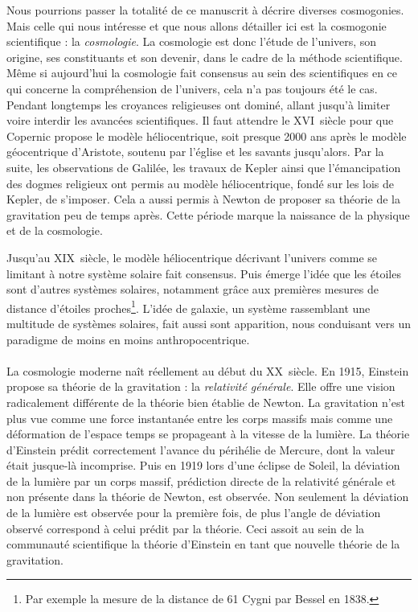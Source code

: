 Nous pourrions passer la totalité de ce manuscrit à décrire diverses cosmogonies. Mais celle qui nous intéresse et que nous allons détailler ici est la cosmogonie scientifique : la \emph{cosmologie}. La cosmologie est donc l'étude de l'univers, son origine, ses constituants et son devenir, dans le cadre de la méthode scientifique. Même si aujourd'hui la cosmologie fait consensus au sein des scientifiques en ce qui concerne la compréhension de l'univers, cela n'a pas toujours été le cas. Pendant longtemps les croyances religieuses ont dominé, allant jusqu'à limiter voire interdir les avancées scientifiques.
Il faut attendre le \textsc{XVI}\ieme~siècle pour que Copernic propose le modèle héliocentrique, soit presque \num{2000} ans après le modèle géocentrique d'Aristote, soutenu par l'église et les savants jusqu'alors.
Par la suite, les observations de Galilée, les travaux de Kepler ainsi que l'émancipation des dogmes religieux ont permis au modèle héliocentrique, fondé sur les lois de Kepler, de s'imposer. Cela a aussi permis à Newton de proposer sa théorie de la gravitation peu de temps après. Cette période marque la naissance de la physique et de la cosmologie.

Jusqu'au \textsc{XIX}\ieme~siècle, le modèle héliocentrique décrivant l'univers comme se limitant à notre système solaire fait consensus. Puis émerge l'idée que les étoiles sont d'autres systèmes solaires, notamment grâce aux premières mesures de distance d'étoiles proches\footnote{Par exemple la mesure de la distance de 61 Cygni par Bessel en 1838.}. L'idée de galaxie, un système rassemblant une multitude de systèmes solaires, fait aussi sont apparition, nous conduisant vers un paradigme de moins en moins anthropocentrique.

\paragraph{}
La cosmologie moderne naît réellement au début du \textsc{XX}\ieme~siècle. En 1915, Einstein propose sa théorie de la gravitation : la \emph{relativité générale}. Elle offre une vision radicalement différente de la théorie bien établie de Newton. La gravitation n'est plus vue comme une force instantanée entre les corps massifs mais comme une déformation de l'espace temps se propageant à la vitesse de la lumière. La théorie d'Einstein prédit correctement l'avance du périhélie de Mercure, dont la valeur était jusque-là incomprise. Puis en 1919 lors d'une éclipse de Soleil, la déviation de la lumière par un corps massif, prédiction directe de la relativité générale et non présente dans la théorie de Newton, est observée. Non seulement la déviation de la lumière est observée pour la première fois, de plus l'angle de déviation observé correspond à celui prédit par la théorie. Ceci assoit au sein de la communauté scientifique la théorie d'Einstein en tant que nouvelle théorie de la gravitation.

